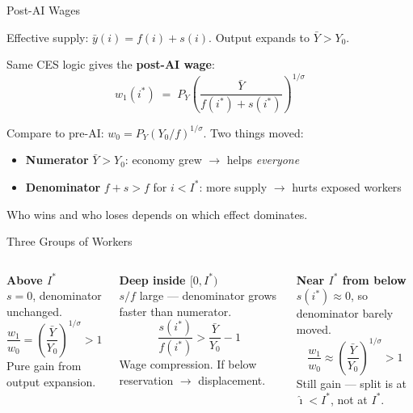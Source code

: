 \documentclass[aspectratio=169]{beamer}
\begin{document}

\begin{frame}{Post-AI Wages}

Effective supply: $\bar y(i) = f(i) + s(i)$.  Output expands to
$\bar Y > Y_0$.

\medskip
Same CES logic gives the \textbf{post-AI wage}:
\[
  \boxed{w_1(i^*) \;=\; P_Y\!\left(\frac{\bar Y}{f(i^*)+s(i^*)}
        \right)^{\!1/\sigma}}
\]

\medskip
Compare to pre-AI: $w_0 = P_Y(Y_0/f)^{1/\sigma}$.  Two things moved:
\begin{itemize}
  \item[\textcolor{mygreen}{$\uparrow$}] \textbf{Numerator} $\bar Y > Y_0$:
        economy grew $\rightarrow$ helps \emph{everyone}
  \item[\textcolor{myred}{$\downarrow$}] \textbf{Denominator} $f{+}s > f$ for
        $i<I^*$: more supply $\rightarrow$ hurts exposed workers
\end{itemize}

\medskip
Who wins and who loses depends on which effect dominates.

\end{frame}

\begin{frame}{Three Groups of Workers}

\begin{columns}[t]
  \textbf{\textcolor{mygreen}{Above $I^*$}}\\[4pt]
  $s=0$, denominator unchanged.
  \[
    \frac{w_1}{w_0} = \left(\frac{\bar Y}{Y_0}\right)^{\!1/\sigma}\!> 1
  \]
  Pure gain from output expansion.

  \textbf{\textcolor{myred}{Deep inside $[0,I^*)$}}\\[4pt]
  $s/f$ large --- denominator grows faster than numerator.
  \[
    \frac{s(i^*)}{f(i^*)} > \frac{\bar Y}{Y_0} - 1
  \]
  Wage compression.  If below reservation $\rightarrow$ displacement.

  \textbf{\textcolor{mygreen}{Near $I^*$ from below}}\\[4pt]
  $s(i^*)\approx 0$, so denominator barely moved.
  \[
    \frac{w_1}{w_0} \approx \left(\frac{\bar Y}{Y_0}\right)^{\!1/\sigma}\!> 1
  \]
  Still gain --- split is at $\hat\imath < I^*$, not at $I^*$.
\end{columns}

\end{frame}
\end{document}
